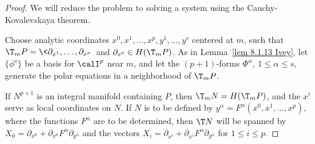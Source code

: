 \begin{proof}
    We will reduce the problem to solving a system using the Cauchy-Kovalevskaya theorem.

    Choose analytic coordinates $x^0,x^1,\ldots,x^p,y^1,\ldots,y^s$ centered at $m$, such that $\T_m P=\<\partial_{x^1},\ldots,\partial_{x^p}\>$ and $\partial_{x^0}\in H(\T_m P)$. As in Lemma~\ref{lem 8.1.13 Ivey}, let $\{\phi^\nu\}$ be a basis for $\calI^p$ near $m$, and let the $(p+1)$-forms $\Phi^\alpha$, $1\leq \alpha\leq s$, generate the polar equations in a neighborhood of $\T_m P$.

    If $N^{p+1}$ is an integral manifold containing $P$, then $\T_m N=H(\T_m P)$, and the $x^i$ serve as local coordinates on $N$. If $N$ is to be defined by $y^\alpha=F^\alpha(x^0,x^1,\ldots,x^p)$, where the functions $F^\alpha$ are to be determined, then $\T N$ will be spanned by $X_0=\partial_{x^0}+\partial_{x^0}F^\alpha\partial_{y^\alpha}$ and the vectors $X_i=\partial_{x^i}+\partial_{x^i}F^\alpha\partial_{y^\alpha}$ for $1\leq i\leq p$. 
    

\end{proof}
